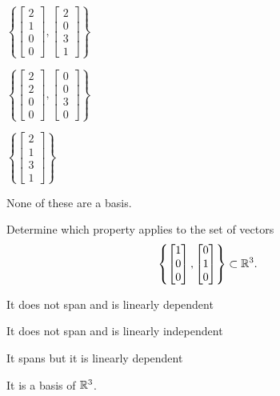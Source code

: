 \documentclass{article}
\begin{document}
\begin{readinessAssuranceTest}
\begin{multicols}{4}
\begin{readinessAssuranceTestChoices}
\item $\left\{ \begin{bmatrix} 2 \\ 1 \\ 0 \\ 0 \end{bmatrix}, \begin{bmatrix} 2 \\ 0 \\ 3 \\ 1 \end{bmatrix} \right\}$
\item $\left\{ \begin{bmatrix} 2 \\ 2 \\ 0 \\ 0 \end{bmatrix}, \begin{bmatrix} 0 \\ 0 \\ 3 \\ 0 \end{bmatrix} \right\}$
\item $\left\{ \begin{bmatrix} 2 \\ 1 \\ 3 \\ 1 \end{bmatrix} \right\}$
\item None of these are a basis.
\end{readinessAssuranceTestChoices}
\end{multicols}


\item Determine which property applies to the set of vectors $$\left\{ \begin{bmatrix}  1 \\ 0 \\ 0 \end{bmatrix}, \begin{bmatrix} 0 \\ 1 \\ 0 \end{bmatrix} \right\} \subset \mathbb{R}^3.$$

\begin{readinessAssuranceTestChoices}
\item It does not span and is linearly dependent
\item It does not span and is linearly independent
\item It spans but it is linearly dependent
\item It is a basis of $\mathbb{R}^3$.
\end{readinessAssuranceTestChoices}



\end{readinessAssuranceTest}
\end{document}
